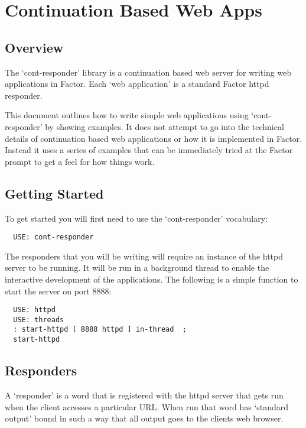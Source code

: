 \chapter{Continuation Based Web Apps}\label{contresponder}

\section{Overview}

The `cont-responder' library is a continuation based web server
for writing web applications in Factor. Each `web application' is a
standard Factor httpd responder.

This document outlines how to write simple web applications using
`cont-responder' by showing examples. It does not attempt to go into
the technical details of continuation based web applications or how it
is implemented in Factor. Instead it uses a series of examples that
can be immediately tried at the Factor prompt to get a feel for how
things work.

\section{Getting Started}

To get started you will first need to use the `cont-responder'
vocabulary:

\begin{verbatim}
  USE: cont-responder
\end{verbatim}

The responders that you will be writing will require an instance of
the httpd server to be running. It will be run in a background thread
to enable the interactive development of the applications. The
following is a simple function to start the server on port 8888:

\begin{verbatim}
  USE: httpd
  USE: threads
  : start-httpd [ 8888 httpd ] in-thread  ;
  start-httpd
\end{verbatim}

\section{Responders}

A `responder' is a word that is registered with the httpd server that
gets run when the client accesses a particular URL. When run that word
has `standard output' bound in such a way that all output goes to the
clients web browser. 

